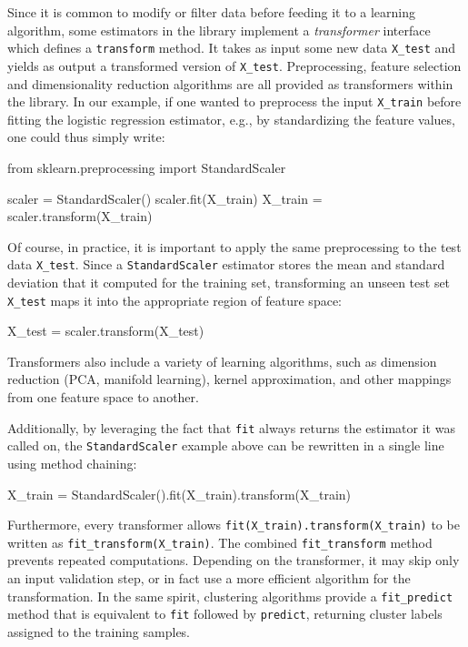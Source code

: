 \documentclass{llncs}
\begin{document}
Since it is common to modify or filter data before feeding it to a learning
algorithm, some estimators in the library implement a \textit{transformer}
interface which defines a \texttt{transform} method. It takes as input some new
data \texttt{X\_test} and yields as output a transformed version of
\texttt{X\_test}. Preprocessing, feature selection and dimensionality reduction
algorithms are all provided as transformers within the library.  In our example,
if one wanted to preprocess the input \texttt{X\_train} before fitting the
logistic regression estimator, e.g., by standardizing the feature values, one
could thus simply write:
\begin{pythoncode}
from sklearn.preprocessing import StandardScaler

scaler = StandardScaler()
scaler.fit(X_train)
X_train = scaler.transform(X_train)
\end{pythoncode}
Of course, in practice, it is important to apply the same preprocessing to the
test data \texttt{X\_test}. Since a \texttt{StandardScaler} estimator stores the
mean and standard deviation that it computed for the training set, transforming
an unseen test set \texttt{X\_test} maps it into the appropriate region of
feature space:
\begin{pythoncode}
X_test = scaler.transform(X_test)
\end{pythoncode}
Transformers also include a variety of learning algorithms, such as
dimension reduction (PCA, manifold learning), kernel approximation,
and other mappings from one feature space to another.

Additionally, by leveraging the fact that \texttt{fit} always returns the
estimator it was called on, the \texttt{StandardScaler} example above can be
rewritten in a single line using method chaining:
\begin{pythoncode}
X_train = StandardScaler().fit(X_train).transform(X_train)
\end{pythoncode}

Furthermore, every transformer allows \texttt{fit(X\_train).transform(X\_train)}
to be written as \texttt{fit\_transform(X\_train)}.
The combined \texttt{fit\_transform} method prevents repeated computations.
Depending on the transformer,
it may skip only an input validation step,
or in fact use a more efficient algorithm for the transformation.
In the same spirit, clustering algorithms provide a
\texttt{fit\_predict} method
that is equivalent to \texttt{fit} followed by \texttt{predict},
returning cluster labels assigned to the training samples.
\end{document}
